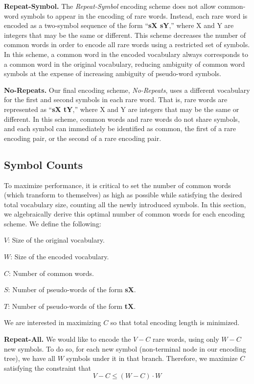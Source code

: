 \noindent\textbf{Repeat-Symbol.}
The \emph{Repeat-Symbol} encoding scheme does not allow common-word symbols to
appear in the encoding of rare words. Instead, each rare word is encoded as a
two-symbol sequence of the form ``\textbf{sX sY},'' where X and Y are integers
that may be the same or different. This scheme decreases the number of common
words in order to encode all rare words using a restricted set of symbols. In
this scheme, a common word in the encoded vocabulary always corresponds to a
common word in the original vocabulary, reducing ambiguity of common word
symbols at the expense of increasing ambiguity of pseudo-word symbols.

\noindent\textbf{No-Repeats.}
Our final encoding scheme, \emph{No-Repeats}, uses a different vocabulary for
the first and second symbols in each rare word. That is, rare words are
represented as ``\textbf{sX tY},'' where X and Y are integers that may be the
same or different.  In this scheme, common words and rare words do not share
symbols, and each symbol can immediately be identified as common, the first of
a rare encoding pair, or the second of a rare encoding pair.

\subsection{Symbol Counts}
To maximize performance, it is critical to set the number of common words (which
transform to themselves) as high as possible while satisfying the desired total vocabulary size,
counting all the newly introduced symbols. In this section, we algebraically derive
this optimal number of common words for each encoding scheme. We define the following:
\begin{description}
\item{$V$:} Size of the original vocabulary.
\item{$W$:} Size of the encoded vocabulary.
\item{$C$:} Number of common words.
\item{$S$:} Number of pseudo-words of the form \textbf{sX}.
\item{$T$:} Number of pseudo-words of the form \textbf{tX}.
\end{description}

We are interested in maximizing $C$ so that total encoding length is minimized.

\noindent\textbf{Repeat-All.}
We would like to encode the $V - C$ rare words, using only $W - C$ new symbols.
To do so, for each new symbol (non-terminal node in our encoding tree), we have
all $W$ symbols under it in that branch. Therefore, we maximize $C$ satisfying
the constraint that
$$V - C \leq (W - C) \cdot W$$


